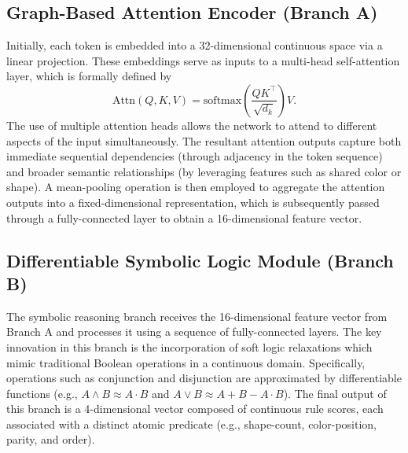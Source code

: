 \documentclass[11pt]{article}
\begin{document}
\subsection{Graph-Based Attention Encoder (Branch A)}
Initially, each token is embedded into a 32-dimensional continuous space via a linear projection. These embeddings serve as inputs to a multi-head self-attention layer, which is formally defined by
\[
\mathrm{Attn}(Q,K,V) = \mathrm{softmax}\left(\frac{QK^\top}{\sqrt{d_k}}\right)V.
\]
The use of multiple attention heads allows the network to attend to different aspects of the input simultaneously. The resultant attention outputs capture both immediate sequential dependencies (through adjacency in the token sequence) and broader semantic relationships (by leveraging features such as shared color or shape). A mean-pooling operation is then employed to aggregate the attention outputs into a fixed-dimensional representation, which is subsequently passed through a fully-connected layer to obtain a 16-dimensional feature vector.

\subsection{Differentiable Symbolic Logic Module (Branch B)}
The symbolic reasoning branch receives the 16-dimensional feature vector from Branch A and processes it using a sequence of fully-connected layers. The key innovation in this branch is the incorporation of soft logic relaxations which mimic traditional Boolean operations in a continuous domain. Specifically, operations such as conjunction and disjunction are approximated by differentiable functions (e.g., \(A \wedge B \approx A \cdot B\) and \(A \vee B \approx A + B - A \cdot B\)). The final output of this branch is a 4-dimensional vector composed of continuous rule scores, each associated with a distinct atomic predicate (e.g., shape-count, color-position, parity, and order).
\end{document}
